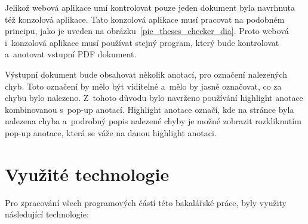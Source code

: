 Jelikož webová aplikace umí kontrolovat pouze jeden dokument byla navrhnuta
též konzolová aplikace. Tato konzolová aplikace musí pracovat na podobném
principu, jako je uveden na obrázku~\ref{pic_theses_checker_dia}. Proto
webová i~konzolová aplikace musí používat stejný program, který bude kontrolovat
a~anotovat vstupní PDF dokument.  

Výstupní dokument bude obsahovat několik anotací, pro označení nalezených chyb.
Toto označení by mělo být viditelné a~mělo by jasně označovat, co za chybu bylo
nalezeno. Z~tohoto důvodu bylo navrženo používání highlight anotace kombinovanou
s~pop-up anotací. Highlight anotace označí, kde na stránce byla nalezena chyba
a~podrobný popis nalezené chyby je možné zobrazit rozkliknutím pop-up anotace,
která se váže na danou highlight anotaci.



\section{Využité technologie}
Pro zpracování všech programových částí této bakalářské práce, byly
využity následující technologie:


